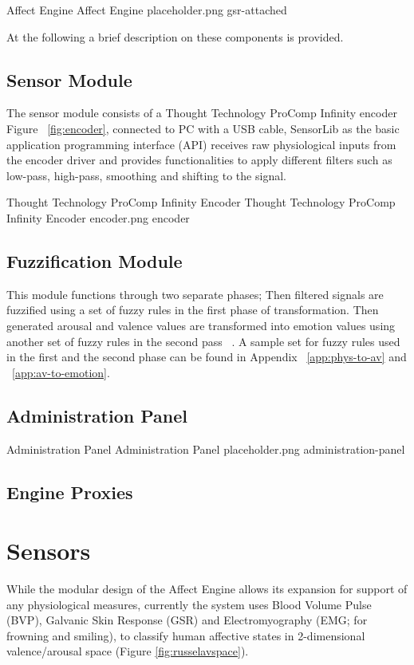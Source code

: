 \img
{Affect Engine}
{Affect Engine}
{placeholder.png}
{gsr-attached}

At the following a brief description on these components is provided.

\subsection{Sensor Module} %
The sensor module consists of a Thought Technology ProComp Infinity encoder ~\cite{tt2013procomp} Figure ~\ref{fig:encoder}, connected to PC with a USB cable, SensorLib as the basic application programming interface (API) receives raw physiological inputs from the encoder driver and provides functionalities to apply different filters such as low-pass, high-pass, smoothing and shifting to the signal.

\img
{Thought Technology ProComp Infinity Encoder}
{Thought Technology ProComp Infinity Encoder}
{encoder.png}
{encoder}

\subsection{Fuzzification Module} \label{subsec:fuzzi} %
This module functions through two separate phases; Then filtered signals are fuzzified using a set of fuzzy rules in the first phase of transformation. Then generated arousal and valence values are transformed into emotion values using another set of fuzzy rules in the second pass ~\cite{mandryk2007fuzzy}. A sample set for fuzzy rules used in the first and the second phase can be found in Appendix ~\ref{app:phys-to-av} and ~\ref{app:av-to-emotion}.



\subsection{Administration Panel}

\img
{Administration Panel}
{Administration Panel}
{placeholder.png}
{administration-panel}

\subsection{Engine Proxies}


\section{Sensors}
While the modular design of the Affect Engine allows its expansion for support of any physiological measures, currently the system uses Blood Volume Pulse (BVP), Galvanic Skin Response (GSR) and Electromyography (EMG; for frowning and smiling), to classify human affective states in 2-dimensional valence/arousal space (Figure \ref{fig:russelavspace}).

